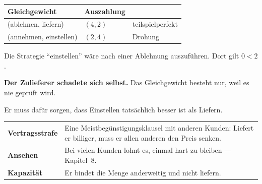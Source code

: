 \begin{aufgabe}
\begin{center}
{\small
\renewcommand{\arraystretch}{1.5}
\begin{tabular}{@{}P{3.4cm}P{1.8cm}P{2.2cm}@{}}
\toprule
\textbf{Gleichgewicht} & \textbf{Aus\-zahlung} & \\
\midrule
(ablehnen, liefern) & $(4,2)$ & \textcolor{gruen}{teilspiel\-perfekt}\\
(annehmen, einstellen) & $(2,4)$ & \textcolor{akzent}{Drohung}\\
\bottomrule
\end{tabular}}
\end{center}

Die Strategie \enquote{einstellen} wäre nach einer Ablehnung auszuführen. Dort gilt $0 < 2$.

\begin{center}
\begin{minipage}{0.9\textwidth}
\textbf{Der Zulieferer schadete sich selbst.} Das Gleichgewicht besteht nur, weil es nie geprüft wird.
\end{minipage}
\end{center}

Er muss dafür sorgen, dass Einstellen tatsächlich besser ist als Liefern.

\begin{center}
{\small
\renewcommand{\arraystretch}{1.5}
\begin{tabular}{@{}P{2.4cm}P{6.2cm}@{}}
\toprule
\textbf{Vertragsstrafe} & Eine Meistbegünstigungsklausel mit anderen Kunden: Liefert er billiger, muss er allen anderen den Preis senken.\\
\textbf{Ansehen} & Bei vielen Kunden lohnt es, einmal hart zu bleiben --- Kapitel~8.\\
\textbf{Kapazität} & Er bindet die Menge anderweitig und  nicht liefern.\\
\bottomrule
\end{tabular}}
\end{center}

\begin{center}
\begin{minipage}{0.88\textwidth}
\end{minipage}
\end{center}
\end{aufgabe}

